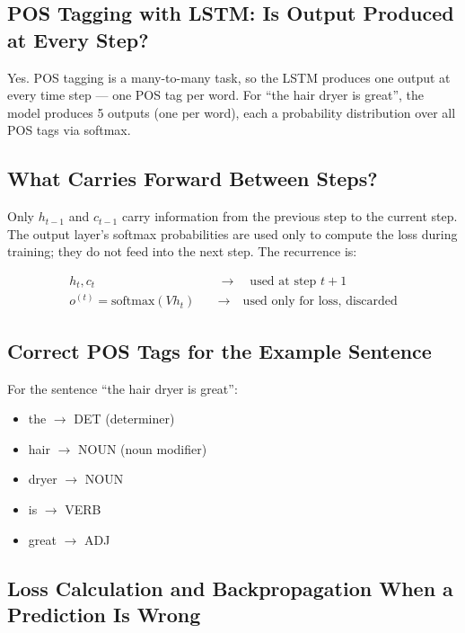 \subsection{POS Tagging with LSTM: Is Output Produced at Every Step?}

Yes. POS tagging is a many-to-many task, so the LSTM produces one output at every
time step --- one POS tag per word. For ``the hair dryer is great'', the model
produces 5 outputs (one per word), each a probability distribution over all POS tags
via softmax.

\subsection{What Carries Forward Between Steps?}

Only $h_{t-1}$ and $c_{t-1}$ carry information from the previous step to the current
step. The output layer's softmax probabilities are used only to compute the loss during
training; they do not feed into the next step. The recurrence is:

\begin{align}
    h_t, c_t \quad &\longrightarrow \quad \text{used at step } t+1 \\
    o^{(t)} = \text{softmax}(Vh_t) \quad &\longrightarrow \quad \text{used only for loss, discarded}
\end{align}

\subsection{Correct POS Tags for the Example Sentence}

For the sentence ``the hair dryer is great'':

\begin{itemize}
    \item the $\to$ DET (determiner)
    \item hair $\to$ NOUN (noun modifier)
    \item dryer $\to$ NOUN
    \item is $\to$ VERB
    \item great $\to$ ADJ
\end{itemize}

\subsection{Loss Calculation and Backpropagation When a Prediction Is Wrong}

